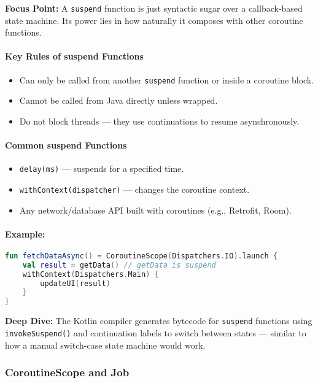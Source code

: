 \documentclass[a4paper,12pt]{article}
\begin{document}
\textbf{Focus Point:} A \texttt{suspend} function is just syntactic sugar over a callback-based state machine. Its power lies in how naturally it composes with other coroutine functions.

\paragraph{Key Rules of suspend Functions}
\begin{itemize}
  \item Can only be called from another \texttt{suspend} function or inside a coroutine block.
  \item Cannot be called from Java directly unless wrapped.
  \item Do not block threads — they use continuations to resume asynchronously.
\end{itemize}

\paragraph{Common suspend Functions}
\begin{itemize}
  \item \texttt{delay(ms)} — suspends for a specified time.
  \item \texttt{withContext(dispatcher)} — changes the coroutine context.
  \item Any network/database API built with coroutines (e.g., Retrofit, Room).
\end{itemize}

\paragraph{Example:}

\begin{lstlisting}[language=Kotlin]
fun fetchDataAsync() = CoroutineScope(Dispatchers.IO).launch {
    val result = getData() // getData is suspend
    withContext(Dispatchers.Main) {
        updateUI(result)
    }
}
\end{lstlisting}

\textbf{Deep Dive:} The Kotlin compiler generates bytecode for \texttt{suspend} functions using \texttt{invokeSuspend()} and continuation labels to switch between states — similar to how a manual switch-case state machine would work.

\subsubsection{CoroutineScope and Job}
\end{document}
